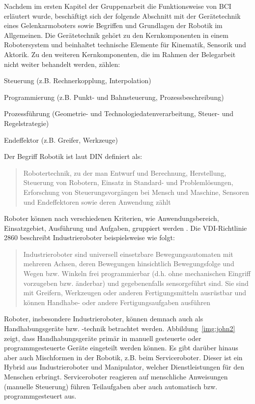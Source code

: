 \documentclass[11pt,ngerman,parskip=half]{scrartcl}
\begin{document}
Nachdem im ersten Kapitel der Gruppenarbeit die Funktionsweise von BCI
erläutert wurde, beschäftigt sich der folgende Abschnitt mit der
Gerätetechnik eines Gelenkarmoboters sowie Begriffen und Grundlagen der
Robotik im Allgemeinen. Die Gerätetechnik gehört zu den Kernkomponenten in
einem Robotersystem und beinhaltet technische Elemente für Kinematik,
Sensorik und Aktorik. Zu den weiteren Kernkomponenten, die im Rahmen der
Belegarbeit nicht weiter behandelt werden, zählen:
\begin{compactitem}
  \item Steuerung (z.B. Rechnerkopplung, Interpolation)
  \item Programmierung (z.B. Punkt- und Bahnsteuerung, Prozessbeschreibung)
  \item Prozessführung (Geometrie- und Technologiedatenverarbeitung, Steuer-
        und Regelstrategie)
  \item Endeffektor (z.B. Greifer, Werkzeuge)
\end{compactitem}
\parencite[vgl.][40]{hesse_taschenbuch_2016}

Der Begriff Robotik ist laut DIN definiert als:
\blockquote[{\cite[DIN EN ISO 8373, zitiert nach][39]
{hesse_taschenbuch_2016}}]{Robotertechnik, zu der man Entwurf und
Berechnung, Herstellung, Steuerung von Robotern, Einsatz in Standard- und
Problemlösungen, Erforschung von Steuerungsvorgängen bei Mensch und Maschine,
Sensoren und Endeffektoren sowie deren Anwendung zählt}.
Roboter können nach verschiedenen Kriterien, wie Anwendungsbereich,
Einsatzgebiet, Ausführung und Aufgaben, gruppiert werden
\parencite[vgl.][25\psq]{hesse_taschenbuch_2016}. Die VDI-Richtlinie 2860
beschreibt Industrieroboter beispielsweise wie folgt:
\blockquote[{\cite[VDI-Richtlinie 2860, zitiert nach][16]
{weber_industrieroboter:_2017}}]{Industrieroboter sind universell
einsetzbare Bewegungsautomaten mit mehreren Achsen, deren Bewegungen
hinsichtlich Bewegungsfolge und Wegen bzw. Winkeln frei programmierbar (d.h.
ohne mechanischen Eingriff vorzugeben bzw. änderbar) und gegebenenfalls
sensorgeführt sind. Sie sind mit Greifern, Werkzeugen oder anderen
Fertigungsmitteln ausrüstbar und können Handhabe- oder andere
Fertigungsaufgaben ausführen}.

Roboter, insbesondere Industrieroboter, können demnach auch als
Handhabungsgeräte bzw. -technik betrachtet werden.
Abbildung~\ref{img:john2} zeigt, dass
Handhabungsgeräte primär in manuell gesteuerte oder programmgesteuerte Geräte
eingeteilt werden können. Es gibt darüber hinaus aber auch Mischformen in der
Robotik, z.B. beim Serviceroboter. Dieser ist ein Hybrid aus Industrieroboter
und Manipulator, welcher Dienstleistungen für den Menschen erbringt.
Serviceroboter reagieren auf menschliche Anweisungen (manuelle Steuerung)
führen Teilaufgaben aber auch automatisch bzw. programmgesteuert aus.
\parencite[vgl.][15--17]{weber_industrieroboter:_2017}
\end{document}
